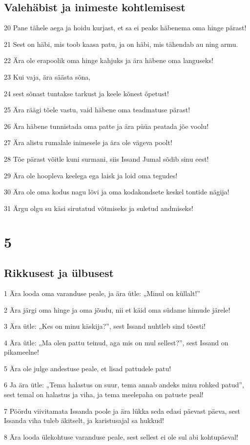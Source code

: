 \section*{Valehäbist ja inimeste kohtlemisest}

\par 20 Pane tähele aega ja hoidu kurjast, et sa ei peaks häbenema oma hinge pärast!
\par 21 Sest on häbi, mis toob kaasa patu, ja on häbi, mis tähendab au ning armu.
\par 22 Ära ole erapoolik oma hinge kahjuks ja ära häbene oma languseks!
\par 23 Kui vaja, ära säästa sõna,
\par 24 sest sõnast tuntakse tarkust ja keele kõnest õpetust!
\par 25 Ära räägi tõele vastu, vaid häbene oma teadmatuse pärast!
\par 26 Ära häbene tunnistada oma patte ja ära püüa peatada jõe voolu!
\par 27 Ära alistu rumalale inimesele ja ära ole vägeva poolt!
\par 28 Tõe pärast võitle kuni surmani, siis Issand Jumal sõdib sinu eest!
\par 29 Ära ole hoopleva keelega ega laisk ja loid oma tegudes!
\par 30 Ära ole oma kodus nagu lõvi ja oma kodakondsete keskel tontide nägija!
\par 31 Ärgu olgu su käsi sirutatud võtmiseks ja suletud andmiseks!

\chapter{5}

\section*{Rikkusest ja ülbusest}

\par 1 Ära looda oma varanduse peale, ja ära ütle: „Minul on küllalt!”
\par 2 Ära järgi oma hinge ja oma jõudu, nii et käid oma südame himude järele!
\par 3 Ära ütle: „Kes on minu käskija?”, sest Issand nuhtleb sind tõesti!
\par 4 Ära ütle: „Ma olen pattu teinud, aga mis on mul sellest?”, sest Issand on pikameelne!
\par 5 Ära ole julge andestuse peale, et lisad pattudele patu!
\par 6 Ja ära ütle: „Tema halastus on suur, tema annab andeks minu rohked patud”, sest temal on halastus ja viha, ja tema meelepaha on patuste peal!
\par 7 Pöördu viivitamata Issanda poole ja ära lükka seda edasi päevast päeva, sest Issanda viha tuleb äkitselt, ja karistusajal sa hukkud!
\par 8 Ära looda ülekohtuse varanduse peale, sest sellest ei ole sul abi kohtupäeval!

